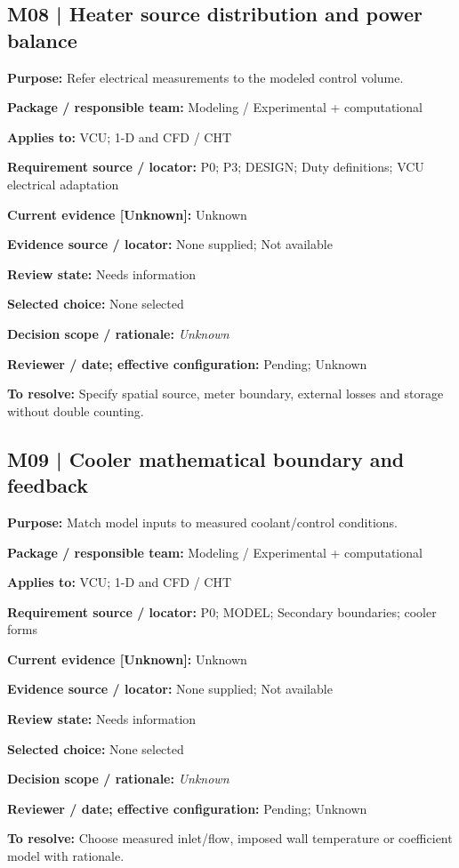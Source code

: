 \documentclass[11pt]{article}
\begin{document}
\begin{minipage}{\textwidth}\small\setlength{\parskip}{2pt}
\subsection*{M08 | Heater source distribution and power balance}
\textbf{Purpose:} Refer electrical measurements to the modeled control volume.\par
\textbf{Package / responsible team:} Modeling / Experimental + computational\par
\textbf{Applies to:} VCU; 1-D and CFD / CHT\par
\textbf{Requirement source / locator:} P0; P3; DESIGN; Duty definitions; VCU electrical adaptation\par
\textbf{Current evidence [Unknown]:} Unknown\par
\textbf{Evidence source / locator:} None supplied; Not available\par
\textbf{Review state:} Needs information\par
\textbf{Selected choice:} None selected\par
\textbf{Decision scope / rationale:} \textit{Unknown}\par
\textbf{Reviewer / date; effective configuration:} Pending; Unknown\par
\textbf{To resolve:} Specify spatial source, meter boundary, external losses and storage without double counting.\par
\end{minipage}\par\vspace{5pt}
\begin{minipage}{\textwidth}\small\setlength{\parskip}{2pt}
\subsection*{M09 | Cooler mathematical boundary and feedback}
\textbf{Purpose:} Match model inputs to measured coolant/control conditions.\par
\textbf{Package / responsible team:} Modeling / Experimental + computational\par
\textbf{Applies to:} VCU; 1-D and CFD / CHT\par
\textbf{Requirement source / locator:} P0; MODEL; Secondary boundaries; cooler forms\par
\textbf{Current evidence [Unknown]:} Unknown\par
\textbf{Evidence source / locator:} None supplied; Not available\par
\textbf{Review state:} Needs information\par
\textbf{Selected choice:} None selected\par
\textbf{Decision scope / rationale:} \textit{Unknown}\par
\textbf{Reviewer / date; effective configuration:} Pending; Unknown\par
\textbf{To resolve:} Choose measured inlet/flow, imposed wall temperature or coefficient model with rationale.\par
\end{minipage}\par\vspace{5pt}
\end{document}
